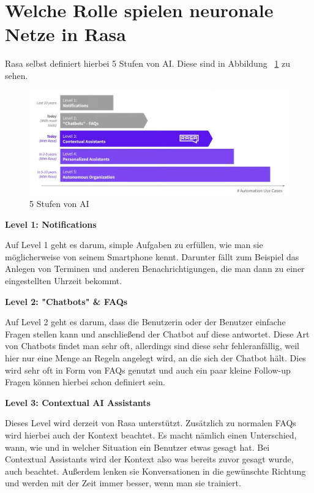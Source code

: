 \section{Welche Rolle spielen neuronale Netze in Rasa}\label{sec:neural-networks}

Rasa selbst definiert hierbei 5 Stufen von AI.
Diese sind in Abbildung ~\ref{fig:5_levels_of_ai} zu sehen\@.\cite{ai5Levels}

\begin{figure}[hbt!]
    \centering
    \includegraphics[scale=0.25]{pics/5_levels_of_ai}
    \caption{5 Stufen von AI~\cite{ai5LevelsVideo}}
    \label{fig:5_levels_of_ai}
\end{figure}

\textbf{Level 1: Notifications}

Auf Level 1 geht es darum, simple Aufgaben zu erfüllen, wie man sie möglicherweise von seinem Smartphone kennt.
Darunter fällt zum Beispiel das Anlegen von Terminen und anderen Benachrichtigungen, die man dann zu einer eingestellten Uhrzeit bekommt.\cite{rasaMasterclass5Levels,ai5Levels,ai5LevelsVideo}

\textbf{Level 2: "Chatbots" \& FAQs}

Auf Level 2 geht es darum, dass die Benutzerin oder der Benutzer einfache Fragen stellen kann und anschließend der Chatbot auf diese antwortet.
Diese Art von Chatbots findet man sehr oft, allerdings sind diese sehr fehleranfällig, weil hier nur eine Menge an Regeln angelegt wird, an die sich der Chatbot hält.
Dies wird sehr oft in Form von FAQs genutzt und auch ein paar kleine Follow-up Fragen können hierbei schon definiert sein.\cite{rasaMasterclass5Levels,ai5Levels,ai5LevelsVideo}

\textbf{Level 3: Contextual AI Assistants}

Dieses Level wird derzeit von Rasa unterstützt.
Zusätzlich zu normalen FAQs wird hierbei auch der Kontext beachtet.
Es macht nämlich einen Unterschied, wann, wie und in welcher Situation ein Benutzer etwas gesagt hat.
Bei Contextual Assistants wird der Kontext also was bereits zuvor gesagt wurde, auch beachtet.
Außerdem lenken sie Konversationen in die gewünschte Richtung und werden mit der Zeit immer besser, wenn man sie trainiert.\cite{rasaMasterclass5Levels,ai5Levels,ai5LevelsVideo}

